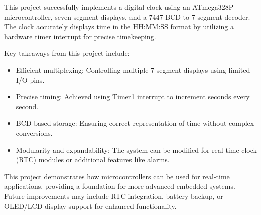 This project successfully implements a digital clock using an ATmega328P microcontroller, seven-segment displays, and a 7447 BCD to 7-segment decoder. The clock accurately displays time in the HH:MM:SS format by utilizing a hardware timer interrupt for precise timekeeping.

Key takeaways from this project include:
\begin{itemize}
    \item Efficient multiplexing: Controlling multiple 7-segment displays using limited I/O pins.
    \item Precise timing: Achieved using Timer1 interrupt to increment seconds every second.
    \item BCD-based storage: Ensuring correct representation of time without complex conversions.
    \item Modularity and expandability: The system can be modified for real-time clock (RTC) modules or additional features like alarms.
\end{itemize}

This project demonstrates how microcontrollers can be used for real-time applications, providing a foundation for more advanced embedded systems. Future improvements may include RTC integration, battery backup, or OLED/LCD display support for enhanced functionality.